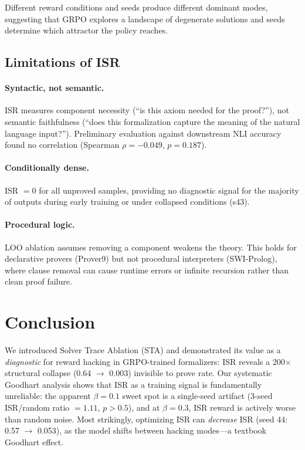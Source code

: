 \documentclass[11pt,a4paper]{article}
\begin{document}
Different reward conditions and seeds produce different dominant modes, suggesting that GRPO explores a landscape of degenerate solutions and seeds determine which attractor the policy reaches.

\subsection{Limitations of ISR}

\paragraph{Syntactic, not semantic.}
ISR measures component necessity (``is this axiom needed for the proof?''), not semantic faithfulness (``does this formalization capture the meaning of the natural language input?'').
Preliminary evaluation against downstream NLI accuracy found no correlation (Spearman $\rho = -0.049$, $p = 0.187$).

\paragraph{Conditionally dense.}
ISR $= 0$ for all unproved samples, providing no diagnostic signal for the majority of outputs during early training or under collapsed conditions (s43).

\paragraph{Procedural logic.}
LOO ablation assumes removing a component weakens the theory.
This holds for declarative provers (Prover9) but not procedural interpreters (SWI-Prolog), where clause removal can cause runtime errors or infinite recursion rather than clean proof failure.

\section{Conclusion}
\label{sec:conclusion}

We introduced Solver Trace Ablation (STA) and demonstrated its value as a \emph{diagnostic} for reward hacking in GRPO-trained formalizers: ISR reveals a 200$\times$ structural collapse (0.64 $\rightarrow$ 0.003) invisible to prove rate.
Our systematic Goodhart analysis shows that ISR as a training signal is fundamentally unreliable: the apparent $\beta{=}0.1$ sweet spot is a single-seed artifact (3-seed ISR/random ratio $= 1.11$, $p > 0.5$), and at $\beta{=}0.3$, ISR reward is actively worse than random noise.
Most strikingly, optimizing ISR can \emph{decrease} ISR (seed 44: 0.57 $\rightarrow$ 0.053), as the model shifts between hacking modes---a textbook Goodhart effect.
\end{document}
